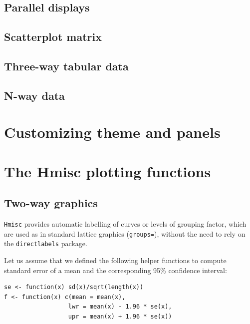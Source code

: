 \documentclass[a4paper,twoside]{book}
\renewcommand{\texttt}[1]{\lstinline{#1}}
\begin{document}
\section{Parallel displays}

\section{Scatterplot matrix}

\section{Three-way tabular data}

\section{N-way data}

\chapter{Customizing theme and panels}


\chapter{The Hmisc plotting functions}

\section{Two-way graphics}

\texttt{Hmisc} provides automatic labelling of curves or levels of grouping
factor, which are used as in standard lattice graphics (\texttt{groups=}),
without the need to rely on the \texttt{directlabels} package. 

Let us assume that we defined the following helper functions to compute
standard error of a mean and the corresponding 95\% confidence interval:
\begin{verbatim}
se <- function(x) sd(x)/sqrt(length(x))
f <- function(x) c(mean = mean(x), 
                  lwr = mean(x) - 1.96 * se(x), 
                  upr = mean(x) + 1.96 * se(x))
\end{verbatim}
\end{document}
